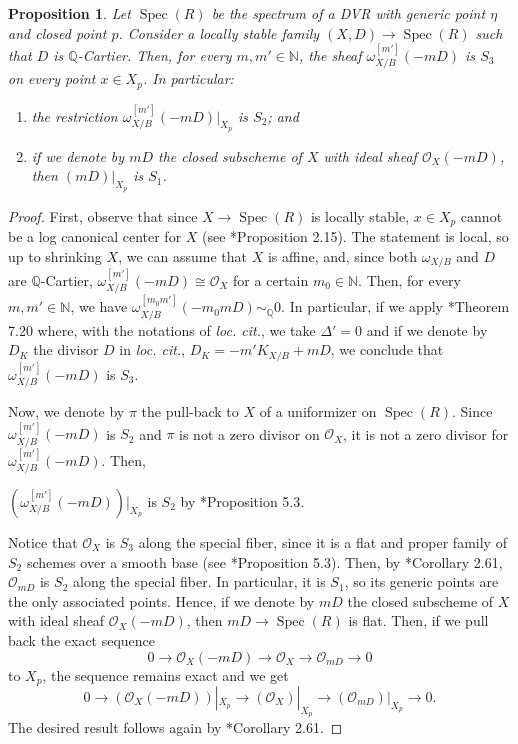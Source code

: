 \documentclass{amsart}
\newcommand{\bQ}{\mathbb{Q}}
\newcommand{\cO}{\mathcal{O}}
\newcommand{\spec}{\operatorname{Spec}}
\newtheorem{Prop}[theorem]{Proposition}
\theoremstyle{definition}
\newcommand{\nn}{\mathbb{N}}
\begin{document}
\begin{Prop}\label{prop:flat:limit:is:S1}
Let $\spec(R)$ be the spectrum of a DVR with generic point $\eta$ and closed point $p$.
Consider a locally stable family $(X,D)\to \spec(R)$ such that $D$ is $\mathbb{Q}$-Cartier.
Then, for every $m, m'\in \mathbb{N}$, the sheaf $\omega_{X/B}^{[m']}(-mD)$ is $S_3$ on every point $x\in X_p$.
In particular:
\begin{enumerate}
    \item the restriction $\omega_{X/B}^{[m']}(-mD)|_{X_p}$ is $S_2$; and
    \item if we denote by $mD$ the closed subscheme of $X$ with ideal sheaf $\cO_X(-mD)$, then $(mD)|_{X_p}$ is $S_1$.
\end{enumerate}
\end{Prop}

\begin{proof}
First, observe that since $X\to \spec(R)$ is locally stable, $x \in X_p$ cannot be a log canonical center for $X$ (see \cite{kol_new}*{Proposition 2.15}).
The statement is local, so up to shrinking $X$, we can assume that $X$ is affine, and, since both $\omega_{X/B}$ and $D$ are $\bQ$-Cartier, $\omega_{X/B}^{[m']}(-mD) \cong \cO_X$ for a certain $m_0 \in \nn$.
Then, for every $m, m' \in \nn$, we have  $\omega_{X/B}^{[m_0m']}(-m_0mD)\sim_\bQ0$.
In particular, if we apply \cite{Kol13}*{Theorem 7.20} where, with the notations of \emph{loc. cit.}, we take $\Delta'=0$ and if we denote by $D_K$ the divisor $D$ in \emph{loc. cit.}, $D_K= - m'K_{X/B} + mD$, we conclude that $\omega_{X/B}^{[m']}(-mD)$ is $S_3$.

Now, we denote by $\pi$ the pull-back to $X$ of a uniformizer on $\spec(R)$.
Since $\omega_{X/B}^{[m']}(-mD)$ is $S_2$ and $\pi$ is not a zero divisor on $\cO_X$, it is not a zero divisor for $\omega_{X/B}^{[m']}(-mD)$.
Then, \begin{center}$(\omega_{X/B}^{[m']}(-mD))|_{X_p}$ is $S_2$ by \cite{KM98}*{Proposition 5.3}.\end{center}

Notice that $\cO_X$ is $S_3$ along the special fiber, since it is a flat and proper family of $S_2$ schemes over a smooth base (see \cite{KM98}*{Proposition 5.3}).
Then, by \cite{Kol13}*{Corollary 2.61}, $\cO_{mD}$ is $S_2$ along the special fiber.
In particular, it is $S_1$, so its generic points are the only associated points.
Hence, if we denote by $mD$ the closed subscheme of $X$ with ideal sheaf $\cO_X(-mD)$, then $mD\to \spec(R)$ is flat.
Then, if we pull back the exact sequence
\[
0\to \cO_X(-mD)\to \cO_X\to \cO_{mD}\to 0
\]
to $X_p$, the sequence remains exact and we get
\[
0\to (\cO_X(-mD))|_{X_p}\to (\cO_X)|_{X_p}\to (\cO_{mD})|_{X_p}\to 0.
\]
The desired result follows again by \cite{Kol13}*{Corollary 2.61}.
\end{proof}
\end{document}
